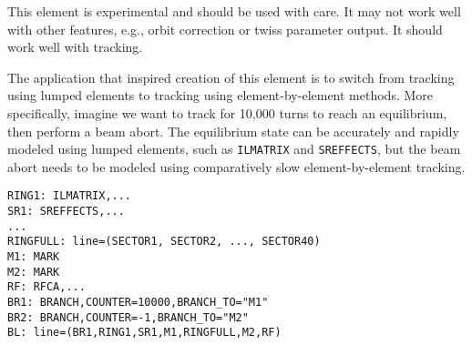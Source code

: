 This element is experimental and should be used with care.
It may not work well with other features, e.g., orbit correction or twiss parameter output.
It should work well with tracking.

The application that inspired creation of this element is to switch from tracking using lumped elements to tracking
using element-by-element methods.
More specifically, imagine we want to track for 10,000 turns to reach an equilibrium, then perform a beam abort.
The equilibrium state can be accurately and rapidly modeled using lumped elements, such as \verb|ILMATRIX| and \verb|SREFFECTS|,
but the beam abort needs to be modeled using comparatively slow element-by-element tracking.
\begin{verbatim}
RING1: ILMATRIX,...
SR1: SREFFECTS,...
...
RINGFULL: line=(SECTOR1, SECTOR2, ..., SECTOR40)
M1: MARK
M2: MARK
RF: RFCA,...
BR1: BRANCH,COUNTER=10000,BRANCH_TO="M1"
BR2: BRANCH,COUNTER=-1,BRANCH_TO="M2"
BL: line=(BR1,RING1,SR1,M1,RINGFULL,M2,RF)
\end{verbatim}

